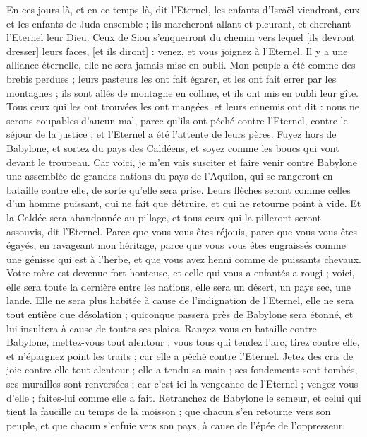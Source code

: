 \begin{multicols}{2}
En ces jours-là, et en ce temps-là, dit l'Eternel, les enfants d'Israël viendront, eux et les enfants de Juda ensemble ; ils marcheront allant et pleurant, et cherchant l'Eternel leur Dieu.
Ceux de Sion s'enquerront du chemin vers lequel [ils devront dresser] leurs faces, [et ils diront] : venez, et vous joignez à l'Eternel. Il y a une alliance éternelle, elle ne sera jamais mise en oubli.
Mon peuple a été comme des brebis perdues ; leurs pasteurs les ont fait égarer, et les ont fait errer par les montagnes ; ils sont allés de montagne en colline, et ils ont mis en oubli leur gîte.
Tous ceux qui les ont trouvées les ont mangées, et leurs ennemis ont dit : nous ne serons coupables d'aucun mal, parce qu'ils ont péché contre l'Eternel, contre le séjour de la justice ; et l'Eternel a été l'attente de leurs pères.
Fuyez hors de Babylone, et sortez du pays des Caldéens, et soyez comme les boucs qui vont devant le troupeau.
Car voici, je m'en vais susciter et faire venir contre Babylone une assemblée de grandes nations du pays de l'Aquilon, qui se rangeront en bataille contre elle, de sorte qu'elle sera prise. Leurs flèches seront comme celles d'un homme puissant, qui ne fait que détruire, et qui ne retourne point à vide.
Et la Caldée sera abandonnée au pillage, et tous ceux qui la pilleront seront assouvis, dit l'Eternel.
Parce que vous vous êtes réjouis, parce que vous vous êtes égayés, en ravageant mon héritage, parce que vous vous êtes engraissés comme une génisse qui est à l'herbe, et que vous avez henni comme de puissants chevaux.
Votre mère est devenue fort honteuse, et celle qui vous a enfantés a rougi ; voici, elle sera toute la dernière entre les nations, elle sera un désert, un pays sec, une lande.
Elle ne sera plus habitée à cause de l'indignation de l'Eternel, elle ne sera tout entière que désolation ; quiconque passera près de Babylone sera étonné, et lui insultera à cause de toutes ses plaies.
Rangez-vous en bataille contre Babylone, mettez-vous tout alentour ; vous tous qui tendez l'arc, tirez contre elle, et n'épargnez point les traits ; car elle a péché contre l'Eternel.
Jetez des cris de joie contre elle tout alentour ; elle a tendu sa main ; ses fondements sont tombés, ses murailles sont renversées ; car c'est ici la vengeance de l'Eternel ; vengez-vous d'elle ; faites-lui comme elle a fait.
Retranchez de Babylone le semeur, et celui qui tient la faucille au temps de la moisson ; que chacun s'en retourne vers son peuple, et que chacun s'enfuie vers son pays, à cause de l'épée de l'oppresseur.

\end{multicols}
